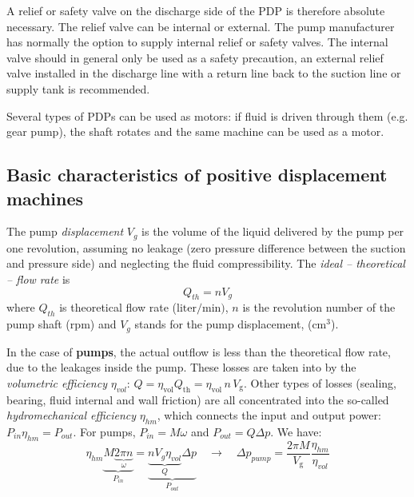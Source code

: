 A relief or safety valve on the discharge side of the PDP is therefore absolute necessary. The relief valve can be internal or external. The pump manufacturer has normally the option to supply internal relief or safety valves. The internal valve should in general only be used as a safety precaution, an external relief valve installed in the discharge line with a return line back to the suction line or supply tank is recommended.

Several types of PDPs can be used as motors: if fluid is driven through them (e.g. gear pump), the shaft rotates and the same machine can be used as a motor.

\clearpage

\subsection{Basic characteristics of positive displacement machines} \label{sec:basic_characteristics_of_positive_displacement_machines}

The pump \emph{displacement} $V_g$ is the volume of the liquid delivered by the pump per one revolution, assuming no leakage (zero pressure difference between the suction and pressure side) and neglecting the fluid compressibility. The \emph{ideal -- theoretical -- flow rate} is
%
\begin{equation}
Q_{th}=n V_g
\label{eq:Qth}
\end{equation}
%
where $Q_{th}$ is theoretical flow rate ($\mathrm{liter/min})$, $n$ is the revolution number of the pump shaft ($\mathrm{rpm}$) and $V_g$ stands for the pump displacement, ($\mathrm{cm^3}$). 

In the case of {\bf pumps}, the actual outflow is less than the theoretical flow rate, due to the leakages inside the pump. These losses are taken into by the \emph{volumetric efficiency} $\eta_{vol}$: $Q=\eta_{\mathrm{vol}} Q_{\mathrm{th}} = \eta_{\mathrm{vol}}\, n\,  V_{\mathrm{g}}$. Other types of losses (sealing, bearing, fluid internal and wall friction) are all concentrated into the so-called \emph{hydromechanical efficiency} $\eta_{hm}$, which connects the input and output power: $P_{in} \eta_{hm}=P_{out}$. For pumps, $P_{in}=M \omega$ and $P_{out}=Q \Delta p$. We have:
%
\begin{equation} \label{power_balance_of_positive_displacement_machines}
\eta_{hm} \underbrace{M \underbrace{2\pi n}_{\omega}}_{P_{in}}=\underbrace{\underbrace{n V_g \eta_{vol}}_Q\Delta p}_{P_{out}}
\quad \rightarrow \quad
\Delta p_{pump}=\frac{2\pi M}{V_{\mathrm{g}}}\frac{\eta_{hm}}{\eta_{vol}}
\end{equation}


